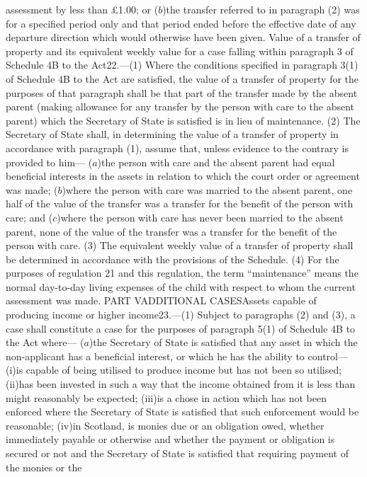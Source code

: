 \documentclass[a4paper]{article}
\begin{document}
assessment by less than £1.00; or
($b$)the transfer referred to in paragraph (2) was for a specified period only and
that period ended before the effective date of any departure direction which
would otherwise have been given.
Value of a transfer of property and its equivalent weekly value for a case
falling within paragraph 3 of Schedule 4B to the Act22.—(1) Where the conditions
specified in paragraph 3(1) of Schedule 4B to the Act are satisfied, the value
of a transfer of property for the purposes of that paragraph shall be that part
of the transfer made by the absent parent (making allowance for any transfer by
the person with care to the absent parent) which the Secretary of State is
satisfied is in lieu of maintenance.
(2) The Secretary of State shall, in determining the value of a transfer of
property in accordance with paragraph (1), assume that, unless evidence to the
contrary is provided to him—
($a$)the person with care and the absent parent had equal beneficial interests in
the assets in relation to which the court order or agreement was made;
($b$)where the person with care was married to the absent parent, one half of the
value of the transfer was a transfer for the benefit of the person with care;
and
($c$)where the person with care has never been married to the absent parent, none
of the value of the transfer was a transfer for the benefit of the person with
care.
(3) The equivalent weekly value of a transfer of property shall be determined in
accordance with the provisions of the Schedule.
(4) For the purposes of regulation 21 and this regulation, the term
“maintenance” means the normal day-to-day living expenses of the child with
respect to whom the current assessment was made.
PART VADDITIONAL CASESAssets capable of producing income or higher income23.—(1)
Subject to paragraphs (2) and (3), a case shall constitute a case for the
purposes of paragraph 5(1) of Schedule 4B to the Act where—
($a$)the Secretary of State is satisfied that any asset in which the non-applicant
has a beneficial interest, or which he has the ability to control—
(i)is capable of being utilised to produce income but has not been so utilised;
(ii)has been invested in such a way that the income obtained from it is less
than might reasonably be expected;
(iii)is a chose in action which has not been enforced where the Secretary of
State is satisfied that such enforcement would be reasonable;
(iv)in Scotland, is monies due or an obligation owed, whether immediately
payable or otherwise and whether the payment or obligation is secured or not and
the Secretary of State is satisfied that requiring payment of the monies or the
\end{document}
